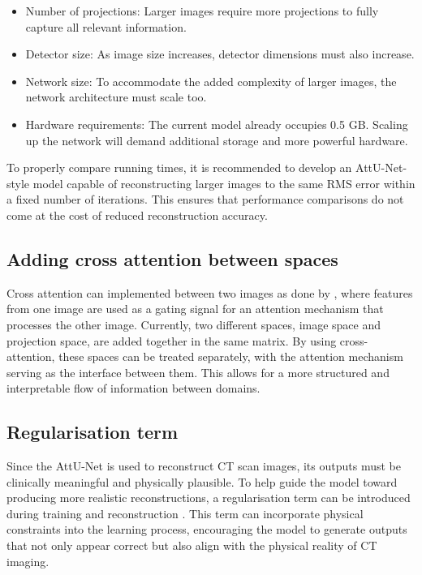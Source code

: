 \documentclass{article}
\begin{document}
\begin{itemize}
\item Number of projections: Larger images require more projections to fully capture all relevant information.
\item Detector size: As image size increases, detector dimensions must also increase.
\item Network size: To accommodate the added complexity of larger images, the network architecture must scale too.
\item Hardware requirements: The current model already occupies 0.5 GB. Scaling up the network will demand additional storage and more powerful hardware.
\end{itemize}

To properly compare running times, it is recommended to develop an AttU-Net-style model capable of reconstructing larger images to the same RMS error within a fixed number of iterations. This ensures that performance comparisons do not come at the cost of reduced reconstruction accuracy.

\subsection{Adding cross attention between spaces}

Cross attention can implemented between two images as done by \citep{alaluf2023cross}, where features from one image are used as a gating signal for an attention mechanism that processes the other image. Currently, two different spaces, image space and projection space, are added together in the same matrix. By using cross-attention, these spaces can be treated separately, with the attention mechanism serving as the interface between them. This allows for a more structured and interpretable flow of information between domains.

\subsection{Regularisation term}

Since the AttU-Net is used to reconstruct CT scan images, its outputs must be clinically meaningful and physically plausible. To help guide the model toward producing more realistic reconstructions, a regularisation term can be introduced during training and reconstruction \citep{ge2023mb}. This term can incorporate physical constraints into the learning process, encouraging the model to generate outputs that not only appear correct but also align with the physical reality of CT imaging.
\end{document}
